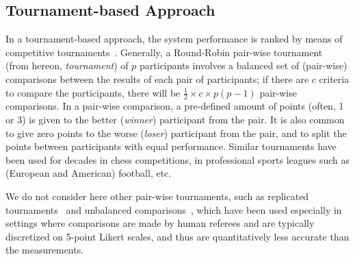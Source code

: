 \subsection{Tournament-based Approach} \label{sec:competitions:tournament}
In a tournament-based approach, the system performance is ranked by means of competitive tournaments~\cite{Thurstone1927}.  Generally, a Round-Robin pair-wise tournament~\cite{David1960} (from hereon, {\it tournament}) of $p$ participants involves a balanced set of (pair-wise) comparisons between the results of each pair of participants; if there are $c$ criteria to compare the participants, there will be $\frac{1}{2} \times c \times p (p - 1)$ pair-wise comparisons. In a pair-wise comparison, a pre-defined amount of points (often, 1 or 3) is given to the better ({\it winner}) participant from the pair. It is also common to give zero points to the worse ({\it loser}) participant from the pair, and to split the points between participants with equal performance. Similar tournaments have been used for decades in chess competitions, in professional sports leagues such as (European and American) football, etc.

We do not consider here other pair-wise tournaments, such as replicated tournaments~\cite{David1960} and unbalanced comparisons~\cite{david1987ranking}, which have been used especially in settings where comparisons are made by human referees and are typically discretized on 5-point Likert scales, and thus are quantitatively less accurate than the \toolname{} measurements.









